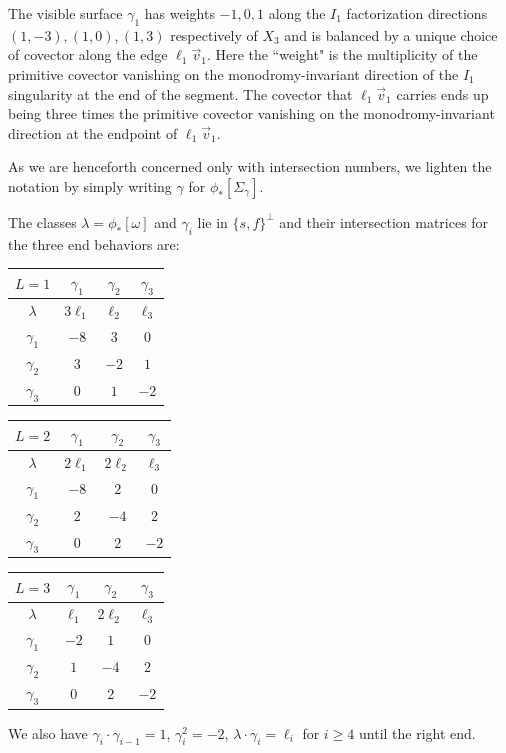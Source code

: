 \documentclass[table,x11names]{amsart}
\begin{document}
\begin{example} The visible surface $\gamma_1$ has
 weights $-1,0,1$ along
 the $I_1$ factorization directions $(1,-3),(1,0),(1,3)$ respectively
of $X_3$ and is balanced by a unique choice of covector along the edge
$\ell_1\vec{v}_1$. Here the ``weight" is the multiplicity of the primitive covector
vanishing on the monodromy-invariant direction of the $I_1$ singularity
at the end of the segment. The covector that $\ell_1\vec{v}_1$ carries ends up
being three times the primitive covector vanishing on the monodromy-invariant
direction at the endpoint
of $\ell_1\vec{v}_1$. \end{example}

As we are henceforth concerned only with intersection numbers,
we lighten the notation by simply writing $\gamma$ for $\phi_*[\Sigma_\gamma]$.
 
 \begin{proposition}\label{vis-int} The classes $\lambda=\phi_*[\omega]$ and $\gamma_i$
 lie in $\{s,f\}^\perp$ and their
 intersection matrices for the three end behaviors are:
 
 \begin{table}[H]
  \begin{tabular}[htp]{c|ccc}
   $L=1$   &$\gamma_1$ &$\gamma_2$ & $\gamma_3$ \\
    \hline
  $\lambda$ 	 & $3\ell_1$ & $\ell_2$ & $\ell_3$ \\
  $\gamma_1$   &  $-8$ & $3$ & $0$ \\
  $\gamma_2$   & $3$ & $-2$ & $1$  \\
  $\gamma_3$   & $0$ & $1$ & $-2$ \\
  \end{tabular}\hspace{5pt}
   \begin{tabular}[htp]{c|ccc}
     $L=2$   &$\gamma_1$ &$\gamma_2$ & $\gamma_3$ \\
    \hline
  $\lambda$ 	& $2\ell_1$ & $2\ell_2$ & $\ell_3$ \\
  $\gamma_1$   & $-8$ & $2$ & $0$ \\
  $\gamma_2$   & $2$ & $-4$ & $2$ \\
  $\gamma_3$   & $0$ & $2$ & $-2$ \\
  \end{tabular}
  \hspace{5pt}
     \begin{tabular}[htp]{c|ccc}
     $L=3$   &$\gamma_1$ &$\gamma_2$ & $\gamma_3$ \\
    \hline
  $\lambda$ & $\ell_1$ & $2\ell_2$ & $\ell_3$ \\
  $\gamma_1$   & $-2$ & $1$ & $0$  \\
  $\gamma_2$   & $1$ & $-4$ & $2$ \\
  $\gamma_3$   & $0$ & $2$ & $-2$ \\
  \end{tabular}
  \end{table}
\noindent We also have $\gamma_i\cdot \gamma_{i-1}=1$, $\gamma_i^2=-2$,
  $\lambda\cdot \gamma_i = \ell_i$ for $i\geq 4$ until the right end.
  \end{proposition} 
  
\end{document}
